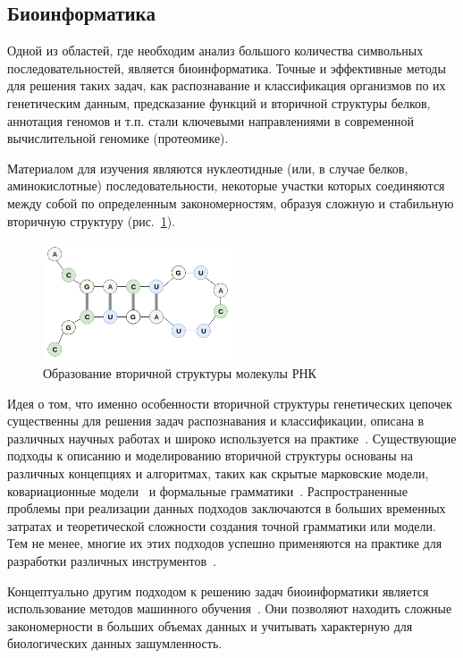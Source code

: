 \subsection{Биоинформатика}
Одной из областей, где необходим анализ большого количества символьных последовательностей, является биоинформатика. Точные и эффективные методы для решения таких задач, как распознавание и классификация организмов по их генетическим данным, предсказание функций и вторичной структуры белков, аннотация геномов и т.п. стали ключевыми направлениями в современной вычислительной геномике (протеомике).

Материалом для изучения являются нуклеотидные (или, в случае белков, аминокислотные) последовательности, некоторые участки которых соединяются между собой по определенным закономерностям, образуя сложную и стабильную вторичную структуру (рис.~\ref{molekula}).

\begin{figure}[h]
\begin{center}
\centering
\includegraphics[width=0.5\textwidth]{Lunina/pics/molekula.png}
\caption{Образование вторичной структуры молекулы РНК}
\label{molekula}
\end{center}
\end{figure}
Идея о том, что именно особенности вторичной структуры генетических цепочек существенны для решения задач распознавания и классификации, описана в различных научных работах и широко используется на практике~\cite{miladi2017rnascclust, vrehakova2014variation}.
Существующие подходы к описанию и моделированию вторичной структуры основаны на различных концепциях и алгоритмах, таких как скрытые марковские модели, ковариационные модели~\cite{EddyDurbin} и формальные грамматики~\cite{LWPCFG,PCFG,GrammarsRNA}. Распространенные проблемы при реализации данных подходов заключаются в больших временных затратах и теоретической сложности создания точной грамматики или модели. Тем не менее, многие их этих подходов успешно применяются на практике для разработки различных инструментов~\cite{hmmer,infernal}.

Концептуально другим подходом к решению задач биоинформатики является использование методов машинного обучения~\cite{ANN,Humidor}. Они позволяют находить сложные закономерности в больших объемах данных и учитывать характерную для биологических данных зашумленность.


